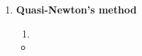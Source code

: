 \documentclass[../main.tex]{subfiles}
\begin{document}
\begin{enumerate}
\begin{enumerate}
        \newpage %
        \item \textbf{Quasi-Newton's method}
        \begin{enumerate}
          \item
        \end{enumerate}
        \begin{itemize}[label=\quad,leftmargin=-5em]
          \item {}
        \end{itemize}
    \end{enumerate}
\end{enumerate}
\end{document}
